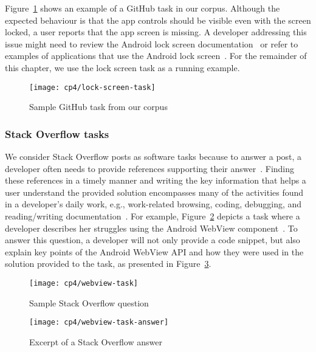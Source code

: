 Figure~\ref{fig:lock-screen-task} shows an example of a GitHub task in our corpus.
Although the expected behaviour is that the app controls should be visible even with the screen locked,  a user reports that the app screen is missing.
A developer addressing this issue might need to review the Android lock screen documentation~\cite{apiLockTask}
or refer to examples of applications that use the Android lock screen~\cite{mediumLockApp}.
For the remainder of this chapter, we use the lock screen task as a running example.


\begin{figure}
    \centering
    \texttt{[image: cp4/lock-screen-task]}
    \caption{Sample GitHub task from our corpus}
    \label{fig:lock-screen-task}
\end{figure}



\subsubsection{Stack Overflow tasks}



We consider Stack Overflow posts as software tasks because to answer a post,
a developer often needs to provide references
supporting their answer~\cite{yazdaninia2021}.
Finding these references in a timely manner and writing the key information that helps a user understand 
 the provided solution encompasses many of the activities found in a developer's daily work, e.g., work-related browsing, coding, debugging, and reading/writing documentation~\cite{Meyer2017}.
For example, Figure~\ref{fig:webview-task} depicts a task where a developer describes her struggles using the Android WebView component~\cite{apiWebView}.
To answer this question, a developer will not only provide a code snippet, but also explain key points of the Android WebView API
and how they were used in the solution provided to the task, 
as presented in Figure~\ref{fig:webview-task-answer}.


\begin{figure}
    \centering
    \texttt{[image: cp4/webview-task]}
    \caption{Sample Stack Overflow question}
    \label{fig:webview-task}
\end{figure}



\begin{figure}
    \centering
    \texttt{[image: cp4/webview-task-answer]}
    \caption{Excerpt of a Stack Overflow answer}
    \label{fig:webview-task-answer}
\end{figure}

